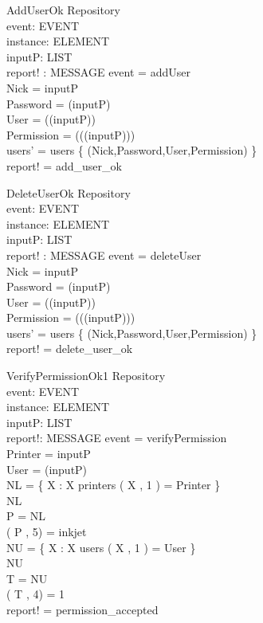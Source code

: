 \begin{schema}{AddUserOk}
\Delta Repository \\
event: EVENT \\
instance: ELEMENT \\
inputP: LIST \\
report! : MESSAGE
\where event = addUser \\
Nick = \head inputP \\
Password = \head (\tail inputP) \\
User = \head (\tail (\tail inputP)) \\
Permission = \head (\tail (\tail (\tail inputP))) \\
users' = users \uni \{ (Nick,Password,User,Permission) \} \\
report! = add\_user\_ok
\end{schema}

\begin{schema}{DeleteUserOk}
\Delta Repository \\
event: EVENT \\
instance: ELEMENT \\
inputP: LIST \\
report! : MESSAGE
\where event = deleteUser \\
Nick = \head inputP \\
Password = \head (\tail inputP) \\
User = \head (\tail (\tail inputP)) \\
Permission = \head (\tail (\tail (\tail inputP))) \\
users' = users \setminus \{ (Nick,Password,User,Permission) \} \\
report! = delete\_user\_ok
\end{schema}

\begin{schema}{VerifyPermissionOk1}
\Delta Repository \\
event: EVENT \\
instance: ELEMENT \\
inputP: LIST \\
report!: MESSAGE
\where event = verifyPermission \\
Printer = \head inputP \\
User = \head (\tail inputP) \\
NL = \{ X : \nat \bbar X \mem printers \land \nth( X , 1 ) = Printer \} \\
NL \neq \emptyset \\
P = \head NL \\
\nth( P , 5) = inkjet \\
NU = \{ X : \nat \bbar X \mem users \land \nth( X , 1 ) = User \} \\
NU \neq \emptyset \\
T = \head NU \\
\nth( T , 4) = 1 \\
report! = permission\_accepted
\end{schema}

